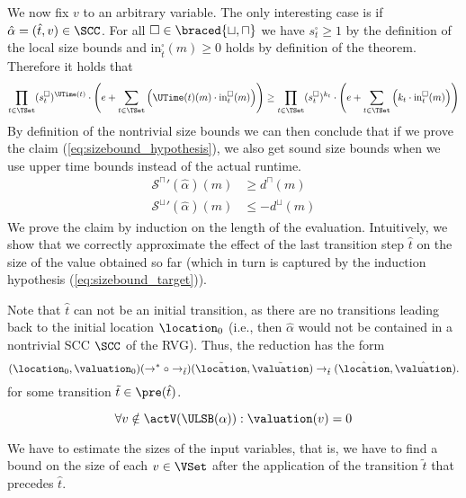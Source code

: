 We now fix $v$ to an arbitrary variable.
The only interesting case is if $\hat{\alpha} = (\hat{t}, v) \in \SCC$.
For all $\square \in \braced{\sqcup, \sqcap}$ we have $s^\square_t \geq 1$ by the definition of the local size bounds and $\text{in}^\square_{\hat{t}}(m) \geq 0$ holds by definition of the theorem.
Therefore it holds that
\[ \prod_{t \in \TSet} (s^\square_t)^{\UTime(t)} \cdot \left( e + \sum_{t \in \TSet} \left( \UTime(t)(m) \cdot \text{in}^\square_t(m) \right) \right) \geq \prod_{t \in \TSet} (s^\square_t)^{k_t} \cdot \left( e + \sum_{t \in \TSet} \left( k_t \cdot \text{in}^\square_t(m) \right) \right) \]
By definition of the nontrivial size bounds we can then conclude that if we prove the claim (\ref{eq:sizebound_hypothesis}), we also get sound size bounds when we use upper time bounds instead of the actual runtime.
\begin{equation}
  \begin{split}
    {\mathcal{S}^\sqcap}'(\hat{\alpha})(m) & \geq d^\sqcap(m) \\
    {\mathcal{S}^\sqcup}'(\hat{\alpha})(m) & \leq -d^\sqcup(m)
  \end{split}
\end{equation}
We prove the claim by induction on the length of the evaluation.
Intuitively, we show that we correctly approximate the effect of the last transition step $\hat{t}$ on the size of the value obtained so far (which in turn is captured by the induction hypothesis (\ref{eq:sizebound_target})).

Note that $\hat{t}$ can not be an initial transition, as there are no transitions leading back to the initial location $\location_0$
(i.e., then $\hat{\alpha}$ would not be contained in a nontrivial SCC $\SCC$ of the RVG).
Thus, the reduction has the form
\[ (\location_0, \valuation_0) (\rightarrow^* \circ \rightarrow_{\tilde{t}}) (\tilde{\location}, \tilde{\valuation}) \rightarrow_{\hat{t}} (\hat{\location}, \hat{\valuation}). \]
for some transition $\tilde{t} \in \pre(\hat{t})$.

\begin{equation} \label{eq:nonactiveequalzero}
  \forall v \notin \actV(\ULSB(\alpha)): \valuation(v) = 0
\end{equation}

We have to estimate the sizes of the input variables,
that is, we have to find a bound on the size of each $v \in \VSet$ after the application of the transition $\tilde{t}$ that precedes $\hat{t}$.

